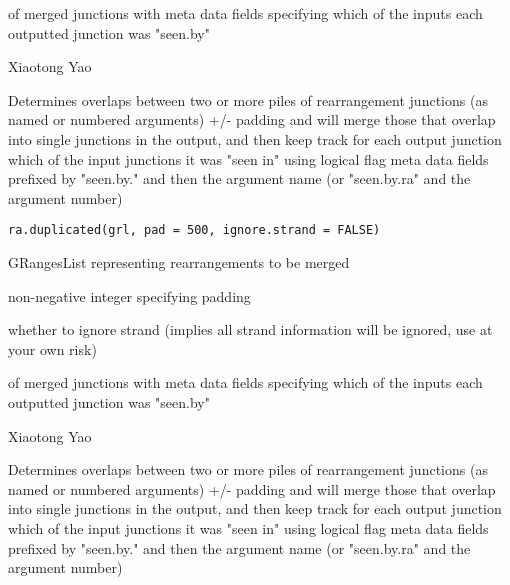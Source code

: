 \documentclass[a4paper]{book}
\begin{document}
%
\begin{Value}
 of merged junctions with meta data fields specifying which of the inputs each outputted junction was "seen.by"
\end{Value}
%
\begin{Author}\relax
Xiaotong Yao
\end{Author}
%
\begin{Description}\relax
Determines overlaps between two or more piles of rearrangement junctions (as named or numbered arguments) +/- padding
and will merge those that overlap into single junctions in the output, and then keep track for each output junction which
of the input junctions it was "seen in" using logical flag  meta data fields prefixed by "seen.by." and then the argument name
(or "seen.by.ra" and the argument number)
\end{Description}
%
\begin{Usage}
\begin{verbatim}
ra.duplicated(grl, pad = 500, ignore.strand = FALSE)
\end{verbatim}
\end{Usage}
%
\begin{Arguments}
\begin{ldescription}
\item[\code{grl}] GRangesList representing rearrangements to be merged

\item[\code{pad}] non-negative integer specifying padding

\item[\code{ignore.strand}] whether to ignore strand (implies all strand information will be ignored, use at your own risk)
\end{ldescription}
\end{Arguments}
%
\begin{Value}
 of merged junctions with meta data fields specifying which of the inputs each outputted junction was "seen.by"
\end{Value}
%
\begin{Author}\relax
Xiaotong Yao
\end{Author}
%
\begin{Description}\relax
Determines overlaps between two or more piles of rearrangement junctions (as named or numbered arguments) +/- padding
and will merge those that overlap into single junctions in the output, and then keep track for each output junction which
of the input junctions it was "seen in" using logical flag  meta data fields prefixed by "seen.by." and then the argument name
(or "seen.by.ra" and the argument number)
\end{Description}
\end{document}
